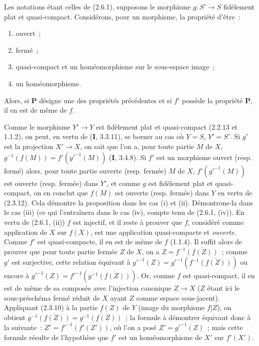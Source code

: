 \begin{proposition}[2.6.2]
\label{IV.2.6.2-fr}
Les notations étant celles de \textup{(2.6.1)}, supposons le morphisme $g:S'\to S$
fidèlement plat et quasi-compact. Considérons, pour un morphisme, la propriété
d'être~:
\begin{enumerate}
\item[\textup{(i)}] ouvert~;
\item[\textup{(ii)}] fermé~;
\item[\textup{(iii)}] quasi-compact et un homéomorphisme sur le sous-espace image~;
\item[\textup{(iv)}] un homéomorphisme.
\end{enumerate}
Alors, si $\boldsymbol{P}$ désigne une des propriétés précédentes et si $f'$ possède la
propriété $\boldsymbol{P}$, il en est de même de $f$.
\end{proposition}

Comme le morphisme $Y'\to Y$ est fidèlement plat et quasi-compact (2.2.13 et
1.1.2), on peut, en vertu de (\textbf{I}, 3.3.11), se borner au cas où $Y=S$,
$Y'=S'$. Si $g'$ est la projection $X'\to X$, on sait que l'on a, pour toute
partie $M$ de $X$, $g^{-1}(f(M))=f'(g'^{-1}(M))$ (\textbf{I}, 3.4.8). Si $f'$ est un morphisme ouvert (resp. fermé) alors, pour toute partie
ouverte (resp. fermée) $M$ de $X$, $f'(g'^{-1}(M))$ est ouverte (resp.
fermée) dans $Y'$, et comme $g$ est fidèlement plat et quasi-compact, on en
conclut que $f(M)$ est ouverte (resp. fermée) dans $Y$ en vertu de (2.3.12).
Cela démontre la proposition dans les cas (i) et (ii). Démontrons-la dans le
cas (iii) (ce qui l'entraînera dans le cas (iv), compte tenu de (2.6.1,
(iv)). En vertu de (2.6.1, (ii)) $f$ est injectif, et il reste à prouver que
$f$, considéré comme application de $X$ sur $f(X)$, est une application
quasi-compacte et \emph{ouverte}. Comme $f'$ est quasi-compacte, il en est de même de
$f$ (1.1.4). Il suffit alors de prouver que pour toute partie fermée $Z$ de
$X$, on a $Z=f^{-1}\overline{(f(Z))}$~; comme $g'$ est surjective, cette relation équivaut à $g'^{-1}(Z)=g'^{-1}(f^{-1}\overline{(f(Z))})$ ou encore à $g'^{-1}(Z)=f'^{-1}(g^{-1}\overline{(f(Z))})$. Or, comme $f$ est quasi-compact, il en est de même de sa composée avec
l'injection canonique $Z\to X$ ($Z$ étant ici le sous-préschéma fermé réduit
de $X$ ayant $Z$ comme espace sous-jacent). Appliquant (2.3.10) à la partie
$f(Z)$ de $Y$ (image du morphisme $f|Z$), on obtient $g^{-1}\overline{(f(Z))}=\overline{g^{-1}(f(Z))}$~; la formule à démontrer équivaut donc à la suivante~: $Z'=f'^{-1}\overline{(f'(Z'))}$, où l'on a posé $Z'=g'^{-1}(Z)$~; mais cette formule résulte de l'hypothèse
que $f'$ est un homéomorphisme de $X'$ sur $f'(X')$.

